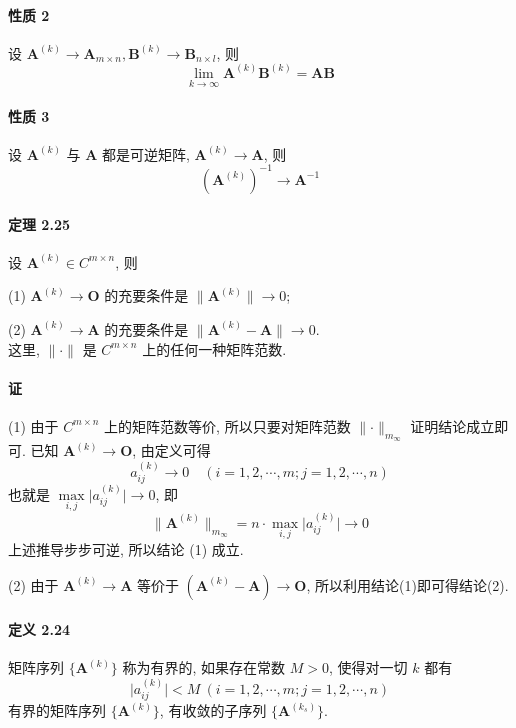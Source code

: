 \paragraph*{性质 2} 设 $\bm{A}^{(k)} \to \bm{A}_{m\times n}, \bm{B}^{(k)} \to \bm{B}_{n\times l}$, 则
$$
    \lim_{k\to \infty} \bm{A}^{(k)}\bm{B}^{(k)} = \bm{AB}
$$

\paragraph*{性质 3} 设 $\bm{A}^{(k)}$ 与 $\bm{A}$ 都是可逆矩阵, $\bm{A}^{(k)} \to \bm{A}$, 则
$$
    (\bm{A}^{(k)})^{-1} \to \bm{A}^{-1}
$$

\paragraph*{定理 2.25} 设 $\bm{A}^{(k)} \in C^{m\times n}$, 则
\par (1) $\bm{A}^{(k)} \to \bm{O}$ 的充要条件是 $\lVert \bm{A}^{(k)} \rVert \to 0$;
\par (2) $\bm{A}^{(k)} \to \bm{A}$ 的充要条件是 $\lVert \bm{A}^{(k)} - \bm{A} \rVert \to 0$.
\\ 这里, $\lVert \bm{\cdot} \rVert$ 是 $C^{m\times n}$ 上的任何一种矩阵范数.

\paragraph*{证} (1) 由于 $C^{m\times n}$ 上的矩阵范数等价, 所以只要对矩阵范数 $\lVert \bm{\cdot} \rVert _{m_\infty}$ 证明结论成立即可.
已知 $\bm{A}^{(k)} \to \bm{O}$, 由定义可得
$$
    a_{ij}^{(k)} \to 0 \quad (i = 1,2,\cdots, m; j = 1, 2, \cdots,n)
$$
也就是 $\mathop{\max}\limits_{i, j} \lvert a_{ij}^{(k)} \rvert \to 0$, 即
$$
    \lVert \bm{A}^{(k)} \rVert _{m_\infty} = n \cdot \mathop{\max}\limits_{i, j} \lvert a_{ij}^{(k)} \rvert \to 0
$$
上述推导步步可逆, 所以结论 (1) 成立.
\par (2) 由于 $\bm{A}^{(k)} \to \bm{A}$ 等价于 $(\bm{A}^{(k)} - \bm{A}) \to \bm{O}$, 所以利用结论(1)即可得结论(2).

\paragraph*{定义 2.24} 矩阵序列 $\{\bm{A}^{(k)}\}$ 称为有界的, 如果存在常数 $M > 0$, 使得对一切 $k$ 都有
$$
    \lvert a_{ij}^{(k)} \rvert < M \ (i = 1, 2, \cdots, m; j = 1, 2, \cdots, n)
$$
有界的矩阵序列 $\{\bm{A}^{(k)}\}$, 有收敛的子序列 $\{\bm{A}^{(k_s)}\}$.

